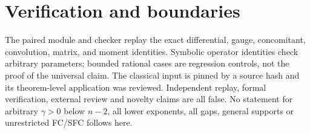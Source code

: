 \documentclass[11pt]{article}
\begin{document}
\section{Verification and boundaries}
The paired module and checker replay the exact differential, gauge,
concomitant, convolution, matrix, and moment identities. Symbolic
operator identities check arbitrary parameters; bounded rational cases
are regression controls, not the proof of the universal claim.
The classical input is pinned by a source hash and its theorem-level
application was reviewed. Independent replay, formal verification,
external review and novelty claims are all false.
No statement for arbitrary $\gamma>0$ below $n-2$, all lower exponents,
all gaps, general supports or unrestricted FC/SFC follows here.
\end{document}
